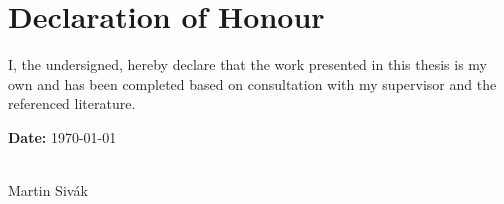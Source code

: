 \thispagestyle{empty}
\null
\vspace*{\fill}

\section*{Declaration of Honour}
\vspace{1cm}

I, the undersigned, hereby declare that the work presented in this thesis is my own and
has been completed based on consultation with my supervisor and the referenced literature.

\vspace{2cm}

\noindent
\begin{minipage}[t]{0.45\textwidth}
  \textbf{Date:} \today
\end{minipage}%
\hfill%
\begin{minipage}[t]{0.45\textwidth}
  \centering
  \hrulefill\\
  Martin Sivák
\end{minipage}

\vspace{2cm}

\clearpage

